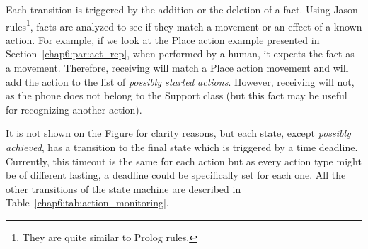\documentclass[a4paper,11pt,twoside]{StyleThese}
\begin{document}
\thispagestyle{example}

Each transition is triggered by the addition or the deletion of a fact. Using Jason rules\footnote{They are quite similar to Prolog rules.}, facts are analyzed to see if they match a movement or an effect of a known action. For example, if we look at the Place action example presented in Section~\ref{chap6:par:act_rep}, when performed by a human, it expects the fact  as a movement. Therefore, receiving  will match a Place action movement and will add the action to the list of \emph{possibly started actions}. However, receiving  will not, as the phone does not belong to the Support class (but this fact may be useful for recognizing another action).
 
It is not shown on the Figure for clarity reasons, but each state, except \emph{possibly achieved}, has a transition to the final state which is triggered by a time deadline. Currently, this timeout is the same for each action but as every action type might be of different lasting, a deadline could be specifically set for each one. All the other transitions of the state machine are described in Table~\ref{chap6:tab:action_monitoring}.


\end{document}
